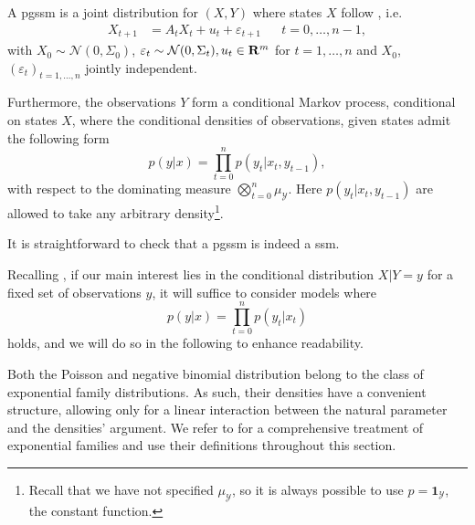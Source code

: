 \begin{definition}
    A \acrfull{pgssm} is a joint distribution for $(X,Y)$ where states $X$ follow , i.e. 
    \begin{align*}
        X_{t + 1}  &= A_{t}X_{t} + u_{t} + \varepsilon_{t + 1} &  & t = 0, \dots, n - 1,
    \end{align*}
    with $X_{0} \sim \mathcal N(0, \Sigma_{0})$, $\varepsilon_{t} \sim \mathcal N (0, \Sigma_{t}), u_{t} \in \mathbf R^{m}$ for $t = 1, \dots, n$ and $X_{0}$, $(\varepsilon_{t})_{t = 1, \dots, n}$ jointly independent. 

    Furthermore, the observations $Y$ form a conditional Markov process, conditional on states $X$, where the conditional densities of observations, given states admit the following form
    $$
    p(y | x) = \prod_{t = 0}^n p(y_{t} | x_{t}, y_{t - 1}),
    $$
    with respect to the dominating measure $\bigotimes_{t = 0}^n\mu_{\mathcal Y}$.
    Here $p(y_{t} | x_{t}, y_{t -1})$ are allowed to take any arbitrary density\footnote{Recall that we have not specified $\mu_{\mathcal Y}$, so it is always possible to use $p = \mathbf 1 _{\mathcal Y}$, the constant function.}.
\end{definition}

It is straightforward to check that a \acrshort{pgssm} is indeed a \acrshort{ssm}. 

\begin{remark}
    Recalling , if our main interest lies in the conditional distribution $X|Y = y$ for a fixed set of observations $y$, it will suffice to consider models where 
    $$
    p(y | x) = \prod_{t = 0}^n p(y_{t} | x_{t})
    $$
    holds, and we will do so in the following to enhance readability. %
\end{remark}

Both the Poisson and negative binomial distribution belong to the class of exponential family distributions. As such, their densities have a convenient structure, allowing only for a linear interaction between the natural parameter and the densities' argument. We refer to \citep{Brown1986Fundamentals} for a comprehensive treatment of exponential families and use their definitions throughout this section.

